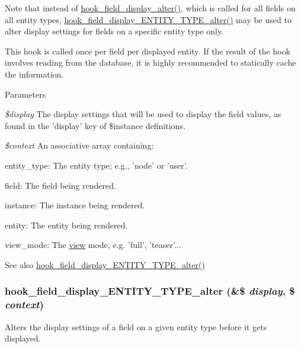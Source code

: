 Note that instead of \hyperlink{group__field__storage_ga7a5d4e018902a0072d5de819bbc7c409}{hook\_\-field\_\-display\_\-alter()}, which is called for all fields on all entity types, \hyperlink{group__field__storage_gadc76e94183dbbeebe237c70be5ca1e96}{hook\_\-field\_\-display\_\-ENTITY\_\-TYPE\_\-alter()} may be used to alter display settings for fields on a specific entity type only.

This hook is called once per field per displayed entity. If the result of the hook involves reading from the database, it is highly recommended to statically cache the information.


\begin{DoxyParams}{Parameters}
\item[{\em \$display}]The display settings that will be used to display the field values, as found in the 'display' key of \$instance definitions. \item[{\em \$context}]An associative array containing:
\begin{DoxyItemize}
\item entity\_\-type: The entity type; e.g., 'node' or 'user'.
\item field: The field being rendered.
\item instance: The instance being rendered.
\item entity: The entity being rendered.
\item view\_\-mode: The \hyperlink{classview}{view} mode, e.g. 'full', 'teaser'...
\end{DoxyItemize}\end{DoxyParams}
\begin{DoxySeeAlso}{See also}
\hyperlink{group__field__storage_gadc76e94183dbbeebe237c70be5ca1e96}{hook\_\-field\_\-display\_\-ENTITY\_\-TYPE\_\-alter()} 
\end{DoxySeeAlso}
\hypertarget{group__field__storage_gadc76e94183dbbeebe237c70be5ca1e96}{
\subsubsection[{hook\_\-field\_\-display\_\-ENTITY\_\-TYPE\_\-alter}]{\setlength{\rightskip}{0pt plus 5cm}hook\_\-field\_\-display\_\-ENTITY\_\-TYPE\_\-alter (\&\$ {\em display}, \/  \$ {\em context})}}
\label{group__field__storage_gadc76e94183dbbeebe237c70be5ca1e96}
Alters the display settings of a field on a given entity type before it gets displayed.

